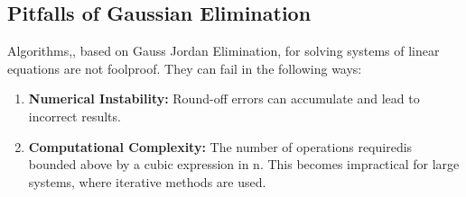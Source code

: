 \documentclass[4pt]{article}
\theoremstyle{definition}
\theoremstyle{plain}
\begin{document}
\subsection{Pitfalls of Gaussian Elimination}
Algorithms,, based on Gauss Jordan Elimination, for solving systems of linear equations are not foolproof. They can fail in the following ways:
\begin{enumerate}
  \item \textbf{Numerical Instability:} Round-off errors can accumulate and lead to incorrect results.
  \item \textbf{Computational Complexity:} The number of operations requiredis bounded above by a cubic expression in n. This becomes impractical for large systems, where iterative methods are used.
\end{enumerate}
\pagebreak
\end{document}
